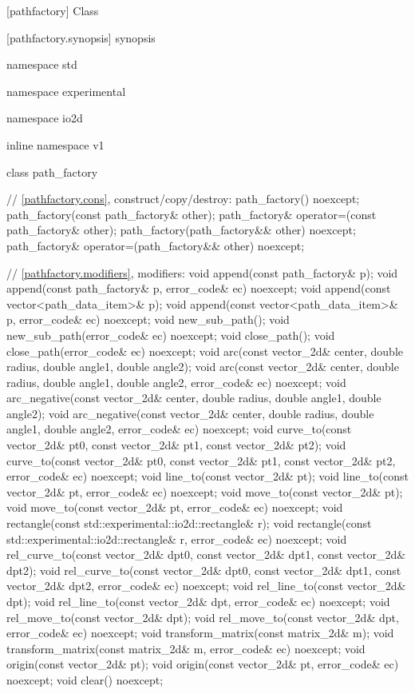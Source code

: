  [pathfactory] {Class }

 [pathfactory.synopsis] { synopsis}

\begin{codeblock}
namespace std { namespace experimental { namespace io2d { inline namespace v1 {
  class path_factory {
    // \ref{pathfactory.cons}, construct/copy/destroy:
    path_factory() noexcept;
    path_factory(const path_factory& other);
    path_factory& operator=(const path_factory& other);
    path_factory(path_factory&& other) noexcept;
    path_factory& operator=(path_factory&& other) noexcept;
    
    // \ref{pathfactory.modifiers}, modifiers:
    void append(const path_factory& p);
    void append(const path_factory& p, error_code& ec) noexcept;
    void append(const vector<path_data_item>& p);
    void append(const vector<path_data_item>& p, error_code& ec) noexcept;
    void new_sub_path();
    void new_sub_path(error_code& ec) noexcept;
    void close_path();
    void close_path(error_code& ec) noexcept;
    void arc(const vector_2d& center, double radius, double angle1,
      double angle2);
    void arc(const vector_2d& center, double radius, double angle1,
      double angle2, error_code& ec) noexcept;
    void arc_negative(const vector_2d& center, double radius, double angle1,
      double angle2);
    void arc_negative(const vector_2d& center, double radius, double angle1,
      double angle2, error_code& ec) noexcept;
    void curve_to(const vector_2d& pt0, const vector_2d& pt1,
      const vector_2d& pt2);
    void curve_to(const vector_2d& pt0, const vector_2d& pt1,
      const vector_2d& pt2, error_code& ec) noexcept;
    void line_to(const vector_2d& pt);
    void line_to(const vector_2d& pt, error_code& ec) noexcept;
    void move_to(const vector_2d& pt);
    void move_to(const vector_2d& pt, error_code& ec) noexcept;
    void rectangle(const std::experimental::io2d::rectangle& r);
    void rectangle(const std::experimental::io2d::rectangle& r,
      error_code& ec) noexcept;
    void rel_curve_to(const vector_2d& dpt0, const vector_2d& dpt1,
      const vector_2d& dpt2);
    void rel_curve_to(const vector_2d& dpt0, const vector_2d& dpt1,
      const vector_2d& dpt2, error_code& ec) noexcept;
    void rel_line_to(const vector_2d& dpt);
    void rel_line_to(const vector_2d& dpt, error_code& ec) noexcept;
    void rel_move_to(const vector_2d& dpt);
    void rel_move_to(const vector_2d& dpt, error_code& ec) noexcept;
    void transform_matrix(const matrix_2d& m);
    void transform_matrix(const matrix_2d& m, error_code& ec) noexcept;
    void origin(const vector_2d& pt);
    void origin(const vector_2d& pt, error_code& ec) noexcept;
    void clear() noexcept;
    
}}}}}
\end{codeblock}
